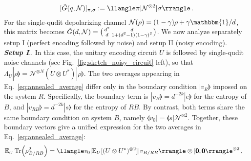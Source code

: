 \documentclass[aps,prl,twocolumn,superscriptaddress,numerical]{revtex4-2}
\newcommand{\Noise}{\mathcal{N}}
\newcommand{\idp}{e} %
\newcommand{\Id}{\mathbbm{1}}
\newcommand{\Ex}{\mathbb{E}} %
\newcommand{\nreplicas}{2}
\renewcommand{\section}[1]{\textbf{\emph{#1}}.\!}
\begin{document}
\begin{equation}
\label{eq:Noisy gram}
    [\Tilde{G}(q,\Noise)]_{\pi,\sigma}:=\llangle \pi |\Noise^{\otimes \nreplicas}|\sigma\rrangle \,.
\end{equation}
For the single-qudit depolarizing channel $\Noise(\rho)=(1-\gamma)\rho+\gamma \Id/d$, this matrix becomes $\Tilde{G}(d,\Noise)=\bigl(\begin{smallmatrix} d^2 & d \\ d & 1+(d^2-1)(1-\gamma)^2 \end{smallmatrix}\bigr)$. We now analyze separately setup I (perfect encoding followed by noise) and setup II (noisy encoding).\\

\section{Setup I}. In this case, the unitary encoding circuit $U$ is followed by single-qudit noise channels (see Fig.~\ref{fig:sketch_noisy_circuit} left), so that $\Lambda_{U}|\rho\rrangle=\Noise^{\otimes N} (U\otimes U^*)|\rho\rrangle$. The two averages appearing in Eq.~\eqref{eq:annealed_average} differ only in the boundary condition $|v_R\rrangle$ imposed on the system $R$. Specifically, the boundary term is $|v_B\rrangle=d^{-\nreplicas k}| \idp\rrangle$ for the entropy of $B$, and $|v_{RB}\rrangle=d^{-\nreplicas k}| s\rrangle$ for the entropy of $RB$. By contrast, both terms share the same boundary condition on system $B$, namely $\llangle v_0|=\llangle s|\mathcal{N}^{\otimes \nreplicas}$. Together, these boundary vectors give a unified expression for the two averages in Eq.~\eqref{eq:annealed_average}:
\begin{equation}
\label{eq:statistical_model}
\begin{split}
    &\Ex_{U}\Tr(\rho_{B / RB}^\nreplicas)=\llangle v_0|\Ex_U[(U\otimes U^*)^{\otimes \nreplicas}] |v_{B / RB}\rrangle\otimes |\pmb{0},\pmb{0}\rrangle^{\otimes 2}\,,
\end{split}
\end{equation}
\end{document}
